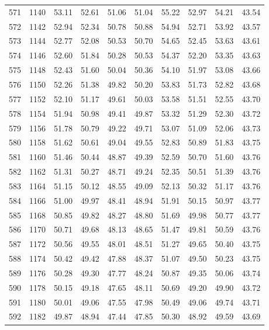 \begin{longtable}{rrllllllll}
		571 & 1140 & 53.11 & 52.61 & 51.06 & 51.04 & 55.22 & 52.97 & 54.21 & 43.54 \\ 
		572 & 1142 & 52.94 & 52.34 & 50.78 & 50.88 & 54.94 & 52.71 & 53.92 & 43.57 \\ 
		573 & 1144 & 52.77 & 52.08 & 50.53 & 50.70 & 54.65 & 52.45 & 53.63 & 43.61 \\ 
		574 & 1146 & 52.60 & 51.84 & 50.28 & 50.53 & 54.37 & 52.20 & 53.35 & 43.63 \\ 
		575 & 1148 & 52.43 & 51.60 & 50.04 & 50.36 & 54.10 & 51.97 & 53.08 & 43.66 \\ 
		576 & 1150 & 52.26 & 51.38 & 49.82 & 50.20 & 53.83 & 51.73 & 52.82 & 43.68 \\ 
		577 & 1152 & 52.10 & 51.17 & 49.61 & 50.03 & 53.58 & 51.51 & 52.55 & 43.70 \\ 
		578 & 1154 & 51.94 & 50.98 & 49.41 & 49.87 & 53.32 & 51.29 & 52.30 & 43.72 \\ 
		579 & 1156 & 51.78 & 50.79 & 49.22 & 49.71 & 53.07 & 51.09 & 52.06 & 43.73 \\ 
		580 & 1158 & 51.62 & 50.61 & 49.04 & 49.55 & 52.83 & 50.89 & 51.83 & 43.75 \\ 
		581 & 1160 & 51.46 & 50.44 & 48.87 & 49.39 & 52.59 & 50.70 & 51.60 & 43.76 \\ 
		582 & 1162 & 51.31 & 50.27 & 48.71 & 49.24 & 52.35 & 50.51 & 51.39 & 43.76 \\ 
		583 & 1164 & 51.15 & 50.12 & 48.55 & 49.09 & 52.13 & 50.32 & 51.17 & 43.76 \\ 
		584 & 1166 & 51.00 & 49.97 & 48.41 & 48.94 & 51.91 & 50.15 & 50.97 & 43.77 \\ 
		585 & 1168 & 50.85 & 49.82 & 48.27 & 48.80 & 51.69 & 49.98 & 50.77 & 43.77 \\ 
		586 & 1170 & 50.71 & 49.68 & 48.13 & 48.65 & 51.47 & 49.81 & 50.59 & 43.76 \\ 
		587 & 1172 & 50.56 & 49.55 & 48.01 & 48.51 & 51.27 & 49.65 & 50.40 & 43.75 \\ 
		588 & 1174 & 50.42 & 49.42 & 47.88 & 48.37 & 51.07 & 49.50 & 50.23 & 43.75 \\ 
		589 & 1176 & 50.28 & 49.30 & 47.77 & 48.24 & 50.87 & 49.35 & 50.06 & 43.74 \\ 
		590 & 1178 & 50.15 & 49.18 & 47.65 & 48.11 & 50.69 & 49.20 & 49.90 & 43.72 \\ 
		591 & 1180 & 50.01 & 49.06 & 47.55 & 47.98 & 50.49 & 49.06 & 49.74 & 43.71 \\ 
		592 & 1182 & 49.87 & 48.94 & 47.44 & 47.85 & 50.30 & 48.92 & 49.59 & 43.69 \\ 

\end{longtable}
